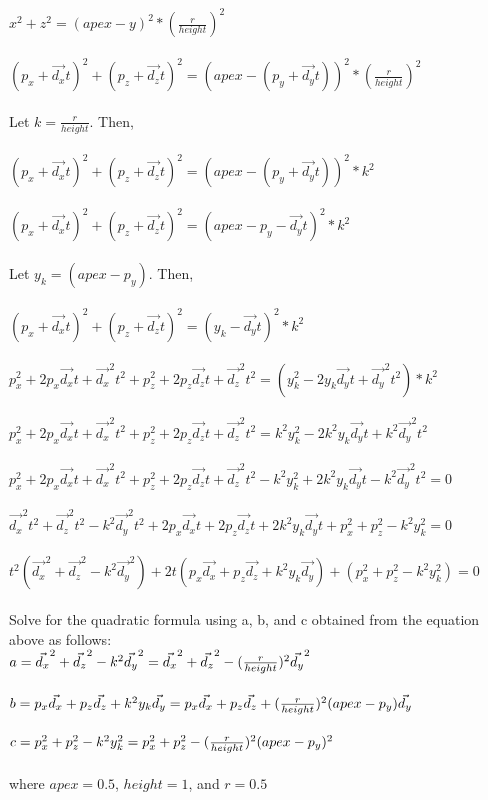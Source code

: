 \documentclass[10pt,twocolumn]{article}
\begin{document}
\begin{framed}
 \\
$x^2+z^2=(apex-y)^2*(\frac{r}{height})^2$\\\\
$(p_x+\vec{d_x}t)^2+(p_z+\vec{d_z}t)^2=(apex-(p_y+\vec{d_y}t))^2*(\frac{r}{height})^2$\\\\
Let $k = \frac{r}{height}$. Then, \\\\
$(p_x+\vec{d_x}t)^2+(p_z+\vec{d_z}t)^2=(apex-(p_y+\vec{d_y}t))^2*k^2$\\\\
$(p_x+\vec{d_x}t)^2+(p_z+\vec{d_z}t)^2=(apex-p_y-\vec{d_y}t)^2*k^2$\\\\
Let $y_k = (apex-p_y)$. Then, \\\\
$(p_x+\vec{d_x}t)^2+(p_z+\vec{d_z}t)^2=(y_k-\vec{d_y}t)^2*k^2$\\\\
$p_x^2+2p_x\vec{d_x}t+\vec{d_x}^2t^2+p_z^2+2p_z\vec{d_z}t+\vec{d_z}^2t^2=(y_k^2-2y_k\vec{d_y}t+\vec{d_y}^2t^2)*k^2$\\\\
$p_x^2+2p_x\vec{d_x}t+\vec{d_x}^2t^2+p_z^2+2p_z\vec{d_z}t+\vec{d_z}^2t^2=k^2y_k^2-2k^2y_k\vec{d_y}t+k^2\vec{d_y}^2t^2$\\\\
$p_x^2+2p_x\vec{d_x}t+\vec{d_x}^2t^2+p_z^2+2p_z\vec{d_z}t+\vec{d_z}^2t^2-k^2y_k^2+2k^2y_k\vec{d_y}t-k^2\vec{d_y}^2t^2=0$\\\\
$\vec{d_x}^2t^2+\vec{d_z}^2t^2-k^2\vec{d_y}^2t^2
+2p_x\vec{d_x}t+2p_z\vec{d_z}t+2k^2y_k\vec{d_y}t+p_x^2+p_z^2-k^2y_k^2=0$\\\\
$t^2(\vec{d_x}^2+\vec{d_z}^2-k^2\vec{d_y}^2)
+2t(p_x\vec{d_x}+p_z\vec{d_z}+k^2y_k\vec{d_y})+(p_x^2+p_z^2-k^2y_k^2)=0$\\\\
Solve for the quadratic formula using a, b, and c obtained from the equation above as follows:\\
$a = \vec{d_x}^2+\vec{d_z}^2-k^2\vec{d_y}^2\\=\vec{d_x}^2+\vec{d_z}^2-(\frac{r}{height})^2\vec{d_y}^2$\\\\
$b=p_x\vec{d_x}+p_z\vec{d_z}+k^2y_k\vec{d_y}\\=p_x\vec{d_x}+p_z\vec{d_z}+(\frac{r}{height})^2(apex-p_y)\vec{d_y}$\\\\
$c=p_x^2+p_z^2-k^2y_k^2\\=p_x^2+p_z^2-(\frac{r}{height})^2(apex-p_y)^2$\\\\
where $apex=0.5$, $height=1$, and $r=0.5$
\end{framed}
\end{document}
